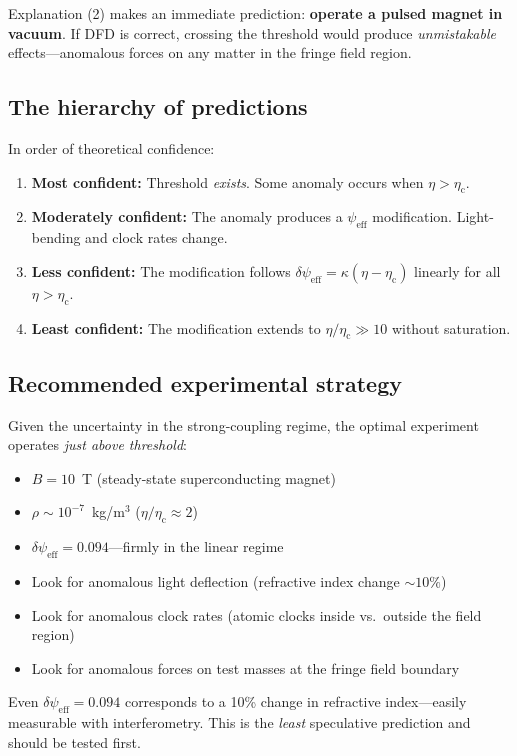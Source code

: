 \documentclass[12pt,a4paper]{article}
\newcommand{\psieff}{\psi_{\mathrm{eff}}}
\newcommand{\etac}{\eta_{\mathrm{c}}}
\begin{document}
Explanation (2) makes an immediate prediction: \textbf{operate a pulsed magnet in vacuum}. If DFD is
correct, crossing the threshold would produce \emph{unmistakable} effects---anomalous forces on any
matter in the fringe field region.

\subsection{The hierarchy of predictions}

In order of theoretical confidence:
\begin{enumerate}
\item \textbf{Most confident:} Threshold \emph{exists}. Some anomaly occurs when $\eta > \etac$.
\item \textbf{Moderately confident:} The anomaly produces a $\psieff$ modification. Light-bending and
      clock rates change.
\item \textbf{Less confident:} The modification follows $\delta\psieff = \kappa(\eta - \etac)$ linearly
      for all $\eta > \etac$.
\item \textbf{Least confident:} The modification extends to $\eta/\etac \gg 10$ without saturation.
\end{enumerate}

\subsection{Recommended experimental strategy}

Given the uncertainty in the strong-coupling regime, the optimal experiment operates \emph{just above threshold}:
\begin{itemize}
\item $B = 10$~T (steady-state superconducting magnet)
\item $\rho \sim 10^{-7}$~kg/m$^3$ ($\eta/\etac \approx 2$)
\item $\delta\psieff = 0.094$---firmly in the linear regime
\item Look for anomalous light deflection (refractive index change $\sim 10\%$)
\item Look for anomalous clock rates (atomic clocks inside vs.\ outside the field region)
\item Look for anomalous forces on test masses at the fringe field boundary
\end{itemize}

Even $\delta\psieff = 0.094$ corresponds to a 10\% change in refractive index---easily measurable
with interferometry. This is the \emph{least} speculative prediction and should be tested first.
\end{document}
